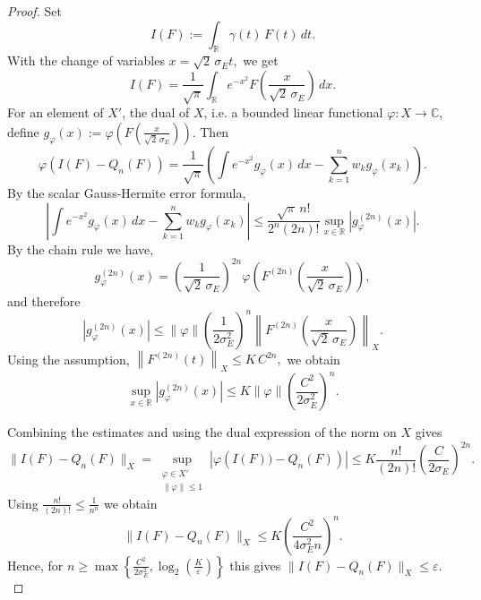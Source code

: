 \documentclass[11pt]{amsart}
\newcommand{\1}{\mathbbm{1}}
\newcommand{\R}{\mathbb{R}}
\newcommand{\C}{\mathbb{C}}
\newcommand{\eps}{\varepsilon}
\renewcommand{\phi}{\varphi}
\newcommand{\bin}[1]{}
\theoremstyle{plain}
\theoremstyle{definition}
\theoremstyle{remark}
\numberwithin{equation}{section}
\begin{document}
\begin{proof}
Set 
\[
I(F):=\int_{\mathbb R} \gamma(t)\,F(t)\,dt.
\]
With the change of variables
$
x=\sqrt2\,\sigma_E t,
$ we get
\[
I(F)
=
\frac{1}{\sqrt{\pi}}
\int_{\mathbb R}
e^{-x^2}
F\!\left(\frac{x}{\sqrt2\,\sigma_E}\right)\,dx.
\]
For an element  of $X'$, the dual of $X$, i.e. a bounded linear functional $\varphi: X\to \C$, define
\(
g_\varphi(x):=
\varphi\!\left(F\!\left(\frac{x}{\sqrt2\,\sigma_E}\right)\right).
\)
Then
\[
\varphi(I(F)-Q_n(F))
=
\frac{1}{\sqrt{\pi}}
\left(
\int e^{-x^2} g_\varphi(x)\,dx
-
\sum_{k=1}^n w_k g_\varphi(x_k)
\right).
\]
By the scalar Gauss-Hermite error formula,
\[
\left|
\int e^{-x^2} g_\varphi(x)\,dx
-
\sum_{k=1}^n w_k g_\varphi(x_k)
\right|
\le
\frac{\sqrt{\pi}\,n!}{2^n(2n)!}
\sup_{x\in\R} |g_\varphi^{(2n)}(x)|.
\]
By the chain rule we have,
\[
g_\varphi^{(2n)}(x)
=
\left(\frac{1}{\sqrt2\,\sigma_E}\right)^{2n}
\varphi\!\left(F^{(2n)}\!\left(\frac{x}{\sqrt2\,\sigma_E}\right)\right),
\]
and therefore
\[
|g_\varphi^{(2n)}(x)|
\le
\|\varphi\|
\left(\frac{1}{2\sigma_E^2}\right)^n
\left\|
F^{(2n)}\!\left(\frac{x}{\sqrt2\,\sigma_E}\right)
\right\|_X.
\]
Using the assumption,
$
\left\|
F^{(2n)}(t)
\right\|_X
\le K\,
C^{2n},$
 we obtain
\[
\sup_{x\in\R}|g_\varphi^{(2n)}(x)|
\le K
\|\varphi\|
\left(\frac{C^2}{2\sigma_E^2}\right)^n.
\]
\bin{Since the Hermite nodes satisfy $|x_k|\lesssim \sqrt{n}$, we bound
\[
\sup_x |g_\varphi^{(2n)}(x)|
\lesssim K
\|\varphi\|
\left(\frac{C^2 n}{\sigma_E^2}\right)^n.
\]}
Combining the estimates and using the dual expression of the norm on $X$ gives
\[
\|I(F)-Q_n(F)\|_X = \sup_{\substack{\phi\in X'\\\|\phi\|\le 1}} \left|\phi\left(I(F)) - Q_n(F)\right)\right|
\le  K
\frac{n!}{(2n)!}
\left(\frac{C }{2\sigma_E}\right)^{2n}.
\]
Using $
\frac{n!}{(2n)!}\le \frac{1}{n^n}$
we obtain
\[
\|I(F)-Q_n(F)\|_X
\le K
\left(\frac{C^2}{4
\sigma_E^2 n}\right)^n.
\]
Hence, for $n\ge \max\left\{\frac{C^2}{2\sigma^2_E},\log_2\left(\frac{K}{\eps}\right)\right\}$ this gives $\|I(F)-Q_n(F)\|_X\le \eps.$
\end{proof}
\end{document}
